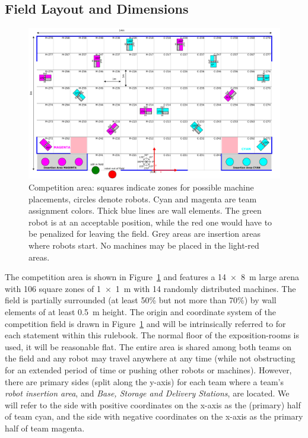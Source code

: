 \documentclass[12pt,twoside]{article}
\newcommand{\reffig}[1]{Figure~\ref{#1}}
\begin{document}
\subsection{Field Layout and Dimensions}
\label{sec:competition-area}
\begin{figure}[p]
    \includegraphics[width=\paperwidth, angle=-90 , trim = 0 0 0 0,]{field2017.pdf}
    \vspace{1ex}
    \caption{Competition area: squares indicate zones for possible
      machine placements, circles denote robots. Cyan and magenta are
      team assignment colors. Thick blue lines are wall elements. The
      green robot is at an acceptable position, while the red one
      would have to be penalized for leaving the field. Grey areas are
      insertion areas where robots start. No machines may be placed in
      the light-red areas.}
    \label{fig:competition-area}
\end{figure}
The competition area is shown in \reffig{fig:competition-area} and
features a \SI{14 x 8}{\metre} large arena with 106 square zones
of \SI{1 x 1}{\metre} with 14 randomly distributed machines. The
field is partially surrounded (at least 50\% but not more than 70\%)
by wall elements of at least \SI{0.5}{\metre} height.  The origin and
coordinate system of the competition field is drawn in
\reffig{fig:competition-area} and will be intrinsically referred to
for each statement within this rulebook. The normal floor of the
exposition-rooms is used, it will be reasonable flat. The entire area
is shared among both teams on the field and any robot may travel
anywhere at any time (while not obstructing for an extended period of
time or pushing other robots or machines). However, there are primary
sides (split along the y-axis) for each team where a team's
\textit{robot insertion area}, and \textit{Base, Storage and Delivery
  Stations}, are located. We will refer to the side with positive
coordinates on the x-axis as the (primary) half of team cyan, and the
side with negative coordinates on the x-axis as the primary half of
team magenta.
\end{document}
